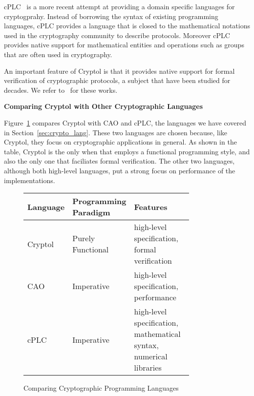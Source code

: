 \documentclass[a4paper, notitlepage]{report}
\renewcommand{\paragraph}[1]{\vspace*{1em}\noindent\textbf{#1}\hspace*{1em}}
\begin{document}
cPLC~\cite{bangerter2011cplc} is a more recent attempt at providing a domain
specific languages for cryptogprahy. Instead of borrowing the syntax of existing
programming languages, cPLC provides a language that is closed to the 
mathematical notations used in the cryptography community to describe 
protocols. Moreover cPLC provides native support for mathematical entities
and operations such as groups that are often used in cryptography.

An important feature of Cryptol is that it provides native support for formal
verification of cryptographic protocols,
a subject that have been studied for decades.
We refer to~\cite{meadows1994formal} for these works.
 

\paragraph{Comparing Cryptol with Other Cryptographic Languages}

Figure~\ref{fig:compare} compares Cryptol with CAO and cPLC, the languages we have
covered in Section~\ref{sec:crypto_lang}. These two languages are chosen because,
like Cryptol, they focus on cryptographic applications in general. As shown in the
table, Cryptol is the only when that employs a functional programming style, and
also the only one that faciliates formal verification. The other two languages,
although both high-level languages, put a strong focus on performance of the
implementations.

\begin{figure}
  \begin{center}
    \begin{tabular}{|l | p{0.2\linewidth} | p{0.6\linewidth} |}
      \hline
      Language & Programming Paradigm & Features \\
      \hline
      Cryptol & Purely Functional  & high-level specification, formal verification \\
      \hline
      CAO~\cite{moss2010bridging} & Imperative & high-level specification, performance \\
      \hline
      cPLC~\cite{bangerter2011cplc} & Imperative & high-level specification, mathematical syntax, numerical libraries \\
      \hline
    \end{tabular}
  \end{center}
  \caption{Comparing Cryptographic Programming Languages}
  \label{fig:compare}
\end{figure}
\end{document}
